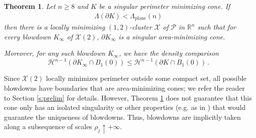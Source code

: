 \documentclass[10pt,reqno]{amsart}
\numberwithin{equation}{section}
\newtheorem{theorem}{Theorem}[section]
\theoremstyle{definition}
\newcommand{\Hcal}{\mathcal{H}}
\newcommand{\Pcal}{\mathcal{P}}
\newcommand{\R}{\mathbb{R}}
\DeclareMathOperator{\plane}{plane}
\newcommand{\X}{\mathcal{X}}
\begin{document}
\begin{theorem}\label{t:higher-dim}
    Let $n \geq 8$ and {$K$ be a singular perimeter minimizing cone}. If
    \begin{align}\label{eq:comp assump in thm}
    \Lambda({\partial K}) < \Lambda_{\plane}(n)    
    \end{align}
    then there is a locally minimizing $(1,2)$-cluster $\X$ of $\Pcal$ in $\R^n$ such that for every blowdown $K_\infty$ of $\X(2)$, $ \partial K_\infty$ is a singular area-minimizing cone.

    Moreover, for any such blowdown $K_\infty$, we have the density comparison
    \begin{equation}\label{e:cone-density-comparison}
        \Hcal^{n-1}(\partial K_\infty\cap B_1(0)) \leq \Hcal^{n-1}(\partial K\cap B_1(0))\,.
    \end{equation}
\end{theorem}
Since $\X(2)$ locally minimizes perimeter outside some compact set, all possible blowdowns have boundaries that are area-minimizing cones; we refer the reader to Section \ref{s:prelim} for details. However, Theorem \ref{t:higher-dim} does not guarantee that this cone only has an isolated singularity or other properties (e.g. as in \cite{Simon_cylindrical}) that would guarantee the uniqueness of blowdowns. Thus, blowdowns are implicitly taken along a subsequence of scales $\rho_j \uparrow +\infty$.
\medskip
\end{document}
